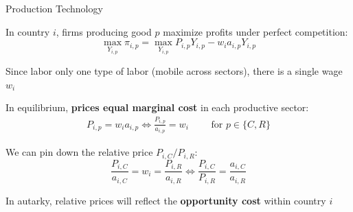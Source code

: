 \documentclass[notes,11pt, aspectratio=169, xcolor=table]{beamer}
\newenvironment{wideitemize}{\itemize\addtolength{\itemsep}{10pt}}{\enditemize}
\begin{document}
\begin{frame}{Production Technology}
\begin{wideitemize}
        \item In country $i$, firms producing good $p$ maximize profits under perfect competition:
        \begin{equation*}
            \max_{Y_{i,p}} \pi_{i,p} = \max_{Y_{i,p}} P_{i,p}Y_{i,p} - w_i a_{i,p} Y_{i,p} 
        \end{equation*}
        \item<2-> Since labor only one type of labor (mobile across sectors), there is a single wage $w_i$
        \item<3-> In equilibrium, \textbf{prices equal marginal cost} in each productive sector:
        \begin{eqnarray*}
            P_{i,p} = w_i a_{i,p} \iff \frac{P_{i,p}}{a_{i,p}} = w_i  \qquad \text{ for } p \in\{C,R\}
        \end{eqnarray*}
        \item<4-> We can pin down the relative price $P_{i,C} / P_{i,R}$:
        \begin{equation*}
            \frac{P_{i,C}}{a_{i,C}} = w_i = \frac{P_{i,R}}{a_{i,R}} \iff \frac{P_{i,C}}{P_{i,R}} = \frac{a_{i,C}}{a_{i,R}}  
        \end{equation*}
    \item<5-> In autarky, relative prices will reflect the \textbf{opportunity cost} within country $i$
    \end{wideitemize}
\end{frame}
\end{document}
